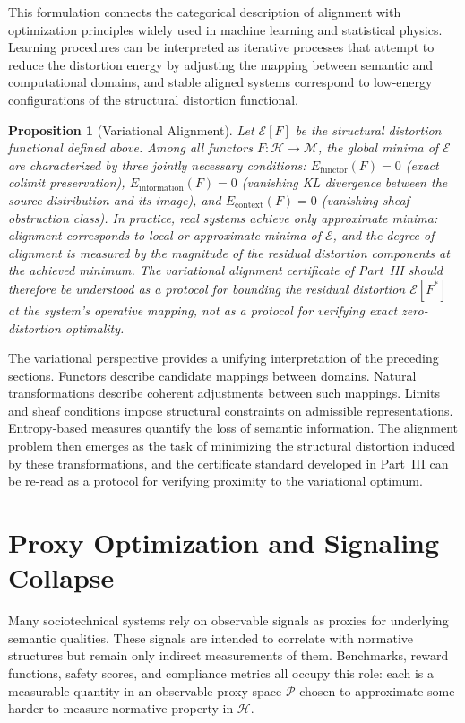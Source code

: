 \documentclass[12pt]{article}
\newtheorem{proposition}[theorem]{Proposition}
\theoremstyle{definition}
\begin{document}
This formulation connects the categorical description of alignment with
optimization principles widely used in machine learning and statistical physics.
Learning procedures can be interpreted as iterative processes that attempt to
reduce the distortion energy by adjusting the mapping between semantic and
computational domains, and stable aligned systems correspond to low-energy
configurations of the structural distortion functional.

\begin{proposition}[Variational Alignment]
\label{prop:variational}
Let $\mathcal{E}[F]$ be the structural distortion functional defined above.
Among all functors $F : \mathcal{H} \to \mathcal{M}$, the global minima of
$\mathcal{E}$ are characterized by three jointly necessary conditions:
$E_{\mathrm{functor}}(F) = 0$ (exact colimit preservation), $E_{\mathrm{information}}(F) = 0$
(vanishing KL divergence between the source distribution and its image), and
$E_{\mathrm{context}}(F) = 0$ (vanishing sheaf obstruction class). In practice,
real systems achieve only approximate minima: alignment corresponds to
\emph{local} or \emph{approximate} minima of $\mathcal{E}$, and the degree of
alignment is measured by the magnitude of the residual distortion components at
the achieved minimum. The variational alignment certificate of Part~III should
therefore be understood as a protocol for bounding the residual distortion
$\mathcal{E}[F^*]$ at the system's operative mapping, not as a protocol for
verifying exact zero-distortion optimality.
\end{proposition}

The variational perspective provides a unifying interpretation of the preceding
sections. Functors describe candidate mappings between domains. Natural
transformations describe coherent adjustments between such mappings. Limits and
sheaf conditions impose structural constraints on admissible representations.
Entropy-based measures quantify the loss of semantic information. The alignment
problem then emerges as the task of minimizing the structural distortion induced
by these transformations, and the certificate standard developed in Part~III
can be re-read as a protocol for verifying proximity to the variational optimum.

\section{Proxy Optimization and Signaling Collapse}

Many sociotechnical systems rely on observable signals as proxies for underlying
semantic qualities. These signals are intended to correlate with normative
structures but remain only indirect measurements of them. Benchmarks, reward
functions, safety scores, and compliance metrics all occupy this role: each is
a measurable quantity in an observable proxy space $\mathcal{P}$ chosen to
approximate some harder-to-measure normative property in $\mathcal{H}$.
\end{document}
